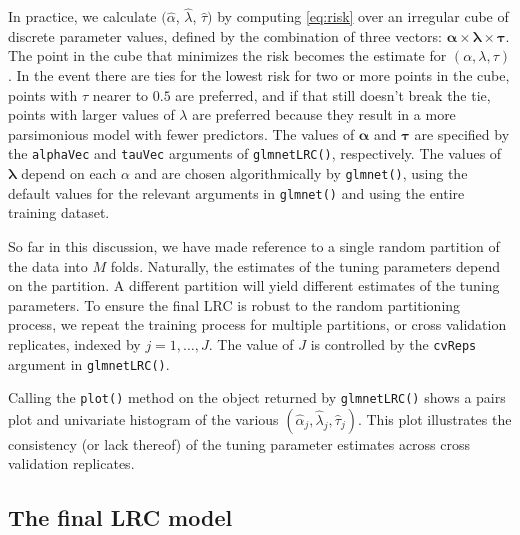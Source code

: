 \documentclass{article}
\begin{document}
In practice, we calculate $(\hat\alpha$, $\hat\lambda$, $\hat\tau)$ by computing \eqref{eq:risk} over an irregular
cube of discrete parameter values, defined by the combination of three vectors:  
$\boldsymbol\alpha \times \boldsymbol\lambda \times \boldsymbol\tau$.
The point in the cube that minimizes the risk becomes the estimate for $(\alpha, \lambda, \tau)$. In the event there
are ties for the lowest risk for two or more points in the cube, points with $\tau$ nearer to $0.5$ are preferred, and
if that still doesn't break the tie, points with larger values of $\lambda$ are preferred because they result in
a more parsimonious model with fewer predictors.
The values of $\boldsymbol\alpha$ and $\boldsymbol\tau$ are specified by the {\tt alphaVec} and {\tt tauVec} arguments
of {\tt glmnetLRC()}, respectively.  The values of $\boldsymbol\lambda$ depend on each $\alpha$ and are chosen algorithmically
by {\tt glmnet()}, using the default values for the relevant arguments in {\tt glmnet()} and using the entire training dataset.

So far in this discussion, we have made reference to a single random partition of the data into $M$ folds. 
Naturally, the estimates of the tuning parameters depend on the partition. A different partition will yield different
estimates of the tuning parameters.  To ensure the final LRC is robust to the random 
partitioning process, we repeat the training process for multiple partitions, or cross validation replicates, 
indexed by $j = 1,\ldots,J$.  The value of $J$ is controlled by the {\tt cvReps} argument in {\tt glmnetLRC()}.

Calling the {\tt plot()} method
on the object returned by {\tt glmnetLRC()} shows a pairs plot and univariate histogram of the
various $(\hat\alpha_j, \hat\lambda_j, \hat\tau_j)$.  This plot illustrates the consistency (or lack thereof) 
of the tuning parameter estimates across cross validation replicates.

\subsection{The final LRC model}
\end{document}
